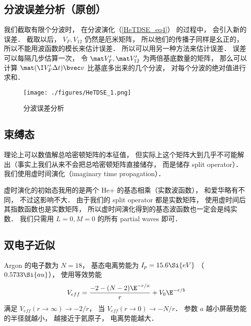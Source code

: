 \subsection{分波误差分析（原创）}
我们截取有限个分波时， 在分波演化（\autoref{HeTDSE_eq4}） 的过程中， 会引入新的误差． 截取以后， $V_F, V_{12}$ 仍然是厄米矩阵， 所以他们的传播子同样是幺正的， 所以不能用波函数的模长来估计误差． 所以可以用另一种方法来估计误差． 误差可以每隔几步估算一次， 令 $\mat V'_F, \mat V'_{12}$ 为两倍基底数量的矩阵， 那么可以计算 $\mat (\I V'_F\Delta t) \bvec v$ 比基底多出来的几个分波， 对每个分波的绝对值进行求和．
\begin{figure}[ht]
\centering
\texttt{[image: ./figures/HeTDSE\_1.png]}
\caption{分波误差分析} \label{HeTDSE_fig1}
\end{figure}

\subsection{束缚态}
理论上可以数值解总哈密顿矩阵的本征值， 但实际上这个矩阵大到几乎不可能解出（事实上我们从来不会把总哈密顿矩阵直接储存， 而是储存 split operator）． 我们使用虚时间演化（imaginary time propagation）．

虚时演化的初始态我用的是两个 He+ 的基态相乘（实数波函数）， 和爱华略有不同， 不过这影响不大． 由于我们的 split operator 都是实数矩阵， 使用虚时间后其指数函数也是实数矩阵， 所以虚时间演化得到的基态波函数也一定会是纯实数．
我们只需用 $L = 0, M = 0$ 的所有 partial waves 即可．

\subsection{双电子近似}
Argon 的电子数为 $N = 18$， 基态电离势能为 $I_p = 15.6\Si{eV}$ （$0.5733\Si{au}$）， 使用等效势能
\begin{equation}
V_{eff} = \frac{-2 - (N-2)\E^{-r/a}}{r} + V_0 \E^{-r/b}
\end{equation}
满足 $V_{eff}(r\to\infty) \to -2/r$， 当 $V_{eff}(r\to 0) \to -N/r$． 参数 $a$ 越小屏蔽势能的半径就越小， 越接近于氦原子， 电离势能越大．
